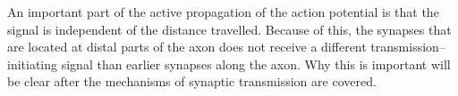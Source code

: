 		An important part of the active propagation of the action potential is that the signal is independent of the distance travelled.
		Because of this, the synapses that are located at distal parts of the axon does not receive a different transmission--initiating signal than earlier synapses along the axon.
		Why this is important will be clear after the mechanisms of synaptic transmission are covered.








% 	
% 
% 
% 
% 
% 	
% 
